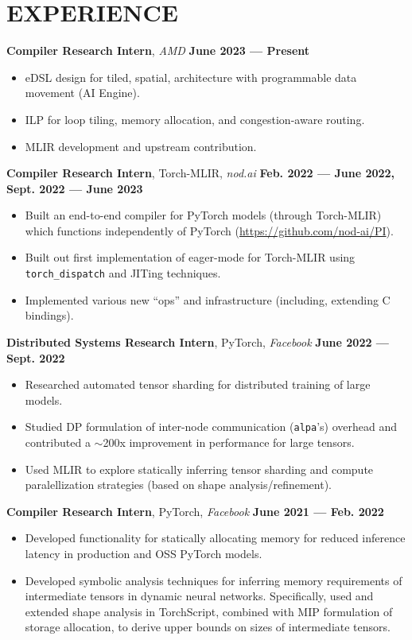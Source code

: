 \documentclass[11pt,letterpaper,roman,colorlinks,linkcolor=blue]{moderncv}
\newcommand*{\modern}{\fontfamily{qhv}\selectfont}
\newcommand{\mystyle}[1]{\textcolor{mygrey}{\modern #1}}
\newcommand{\mysectionstyle}[1]{\large\mystyle{#1}}
\begin{document}
\section{\mysectionstyle{EXPERIENCE}}

\textbf{Compiler Research Intern}, \emph{AMD}
\hfill \textbf{June 2023 --- Present}
\begin{itemize}
\item eDSL design for tiled, spatial, architecture with programmable data movement (AI Engine).
\item ILP for loop tiling, memory allocation, and congestion-aware routing.
\item MLIR development and upstream contribution.
\end{itemize}

\textbf{Compiler Research Intern}, Torch-MLIR, \emph{nod.ai}
\hfill \textbf{Feb. 2022 --- June 2022, Sept. 2022 --- June 2023}
\begin{itemize}
\item Built an end-to-end compiler for PyTorch models (through Torch-MLIR) which functions independently of PyTorch (\href{https://github.com/nod-ai/PI}{https://github.com/nod-ai/PI}).
\item Built out first implementation of eager-mode for Torch-MLIR using \texttt{torch\_dispatch} and JITing techniques.
\item Implemented various new ``ops'' and infrastructure (including, extending C bindings).
\end{itemize}

\textbf{Distributed Systems Research Intern}, PyTorch, \emph{Facebook}
\hfill \textbf{June 2022 --- Sept. 2022}
\begin{itemize}
\item Researched automated tensor sharding for distributed training of large models.
\item Studied DP formulation of inter-node communication (\texttt{alpa}'s) overhead and contributed a $\sim$200x improvement in performance for large tensors.
\item Used MLIR to explore statically inferring tensor sharding and compute paralellization strategies (based on shape analysis/refinement).
\end{itemize}

\textbf{Compiler Research Intern}, PyTorch, \emph{Facebook}
\hfill \textbf{June 2021 --- Feb. 2022}
\begin{itemize}
\item Developed functionality for statically allocating memory for reduced inference latency in production and OSS PyTorch models.
\item Developed symbolic analysis techniques for inferring memory requirements of intermediate tensors in dynamic neural networks. Specifically, used and extended shape analysis in TorchScript, combined with MIP formulation of storage allocation, to derive upper bounds on sizes of intermediate tensors.  
\end{itemize}
\end{document}
